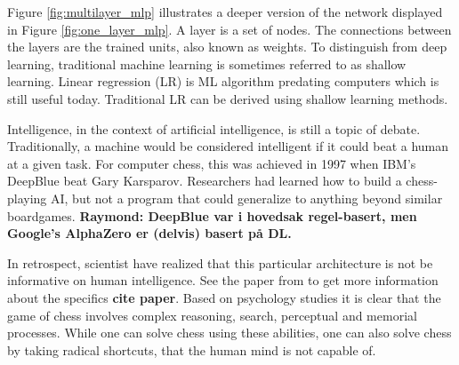 \documentclass{article}
\begin{document}

Figure \ref{fig:multilayer_mlp} illustrates a deeper version of the network displayed in Figure \ref{fig:one_layer_mlp}. A layer is a set of nodes. The connections between the layers are the trained units, also known as weights. To distinguish from deep learning, traditional machine learning is sometimes referred to as shallow learning. Linear regression (LR) is ML algorithm predating computers which is still useful today. Traditional LR can be derived using shallow learning methods. 

Intelligence, in the context of artificial intelligence, is still a topic of debate. Traditionally, a machine would be considered intelligent if it could beat a human at a given task. For computer chess, this was achieved in 1997 when IBM's DeepBlue beat Gary Karsparov. Researchers had learned how to build a chess-playing AI, but not a program that could generalize to anything beyond similar boardgames. \textbf{Raymond: DeepBlue var i hovedsak regel-basert, men Google's AlphaZero er (delvis) basert på DL.}

In retrospect, scientist have realized that this particular architecture is not be informative on human intelligence. See the paper from to get more information about the specifics \textbf{cite paper}. Based on psychology studies it is clear that the game of chess involves complex reasoning, search, perceptual and memorial processes. While one can solve chess using these abilities, one can also solve chess by taking radical shortcuts, that the human mind is not capable of. 
 

\end{document}
